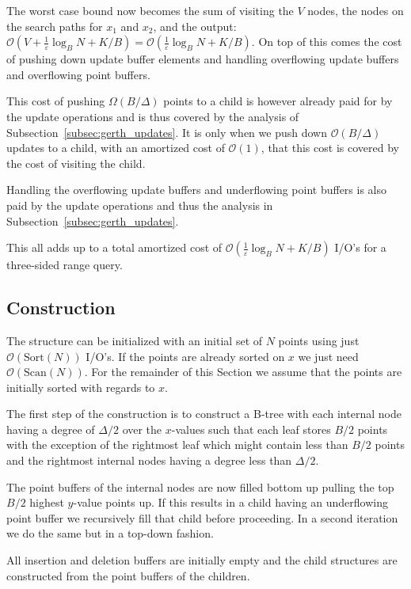 \documentclass[twoside,11pt,openright]{report}
\def \epsilon {\varepsilon}
\begin{document}
The worst case bound now becomes the sum of visiting the $V$ nodes, the nodes on the search paths for $x_1$ and $x_2$, and the output: $\mathcal{O}(V+\frac{1}{\epsilon}\log_B N + K/B) = \mathcal{O}(\frac{1}{\epsilon}\log_B N + K/B)$.
On top of this comes the cost of pushing down update buffer elements and handling overflowing update buffers and overflowing point buffers.

This cost of pushing $\Omega(B/\Delta)$ points to a child is however already paid for by the update operations and is thus covered by the analysis of Subsection~\ref{subsec:gerth_updates}. It is only when we push down $\mathcal{O}(B/\Delta)$ updates to a child, with an amortized cost of $\mathcal{O}(1)$, that this cost is covered by the cost of visiting the child.

Handling the overflowing update buffers and underflowing point buffers is also paid by the update operations and thus the analysis in Subsection~\ref{subsec:gerth_updates}.

This all adds up to a total amortized cost of $\mathcal{O}(\frac{1}{\epsilon} \log_B N + K/B)$ I/O's for a three-sided range query.

\subsection{Construction}
The structure can be initialized with an initial set of $N$ points using just $\mathcal{O}(\text{Sort}(N))$ I/O's. If the points are already sorted on $x$ we just need $\mathcal{O}(\text{Scan}(N))$. For the remainder of this Section we assume that the points are initially sorted with regards to $x$.

The first step of the construction is to construct a B-tree with each internal node having a degree of $\Delta/2$ over the $x$-values such that each leaf stores $B/2$ points with the exception of the rightmost leaf which might contain less than $B/2$ points and the rightmost internal nodes having a degree less than $\Delta/2$.

The point buffers of the internal nodes are now filled bottom up pulling the top $B/2$ highest $y$-value points up. If this results in a child having an underflowing point buffer we recursively fill that child before proceeding. In a second iteration we do the same but in a top-down fashion.

All insertion and deletion buffers are initially empty and the child structures are constructed from the point buffers of the children.
\end{document}
